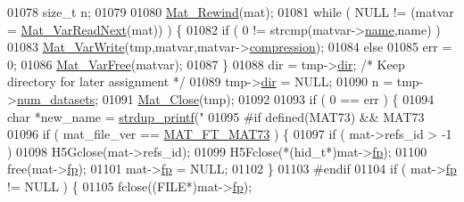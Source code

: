 \begin{DoxyCode}
{{{{{{{{{{{{{{{{{{{{{{{{{01078             \textcolor{keywordtype}{size\_t} n;
01079 
01080             \hyperlink{group___m_a_t_ga4d6e3892d2e216c507a744ba0e070d0b}{Mat\_Rewind}(mat);
01081             \textcolor{keywordflow}{while} ( NULL != (matvar = \hyperlink{group___m_a_t_ga7c321d6aafd93916ba6c5655ad78e9ca}{Mat\_VarReadNext}(mat)) ) \{
01082                 \textcolor{keywordflow}{if} ( 0 != strcmp(matvar->\hyperlink{group___m_a_t_a5d4b55b041e3b4fb50c04337f05ad909}{name},name) )
01083                     \hyperlink{group___m_a_t_ga4bd3eba12df415d8226e27c457fbbb0b}{Mat\_VarWrite}(tmp,matvar,matvar->\hyperlink{group___m_a_t_aeef0466048621cb2c959ba7f6c774d06}{compression});
01084                 \textcolor{keywordflow}{else}
01085                     err = 0;
01086                 \hyperlink{group___m_a_t_ga1d14716f7450530fd1c9d02413787f0e}{Mat\_VarFree}(matvar);
01087             \}
01088             dir = tmp->\hyperlink{struct__mat__t_a1bc6c604459d0787801d5e53d365684c}{dir}; \textcolor{comment}{/* Keep directory for later assignment */}
01089             tmp->\hyperlink{struct__mat__t_a1bc6c604459d0787801d5e53d365684c}{dir} = NULL;
01090             n = tmp->\hyperlink{struct__mat__t_af37d0ba323e65edb27ecd5a2f766a3a4}{num\_datasets};
01091             \hyperlink{group___m_a_t_ga101c92ff7bde4a2d4615661beba09262}{Mat\_Close}(tmp);
01092 
01093             \textcolor{keywordflow}{if} ( 0 == err ) \{
01094                 \textcolor{keywordtype}{char} *new\_name = \hyperlink{group__mat__util_ga291b08f933c75fb70e3736b669896ebd}{strdup\_printf}(\textcolor{stringliteral}{"%
01095 \textcolor{preprocessor}{#if defined(MAT73) && MAT73}
01096                 \textcolor{keywordflow}{if} ( mat\_file\_ver == \hyperlink{group___m_a_t_ggad03442b8378999189d510e3745c702b7a765c5d1d5038947646260dc82483517e}{MAT\_FT\_MAT73} ) \{
01097                     \textcolor{keywordflow}{if} ( mat->refs\_id > -1 )
01098                         H5Gclose(mat->refs\_id);
01099                     H5Fclose(*(hid\_t*)mat->\hyperlink{struct__mat__t_a85f562e407ca9ad4d2a6e14f839432b7}{fp});
01100                     free(mat->\hyperlink{struct__mat__t_a85f562e407ca9ad4d2a6e14f839432b7}{fp});
01101                     mat->\hyperlink{struct__mat__t_a85f562e407ca9ad4d2a6e14f839432b7}{fp} = NULL;
01102                 \}
01103 \textcolor{preprocessor}{#endif}
01104                 \textcolor{keywordflow}{if} ( mat->\hyperlink{struct__mat__t_a85f562e407ca9ad4d2a6e14f839432b7}{fp} != NULL ) \{
01105                     fclose((FILE*)mat->\hyperlink{struct__mat__t_a85f562e407ca9ad4d2a6e14f839432b7}{fp});
}}}}}}}}}}}}}}}}}}}}}}}}}}
\end{DoxyCode}
